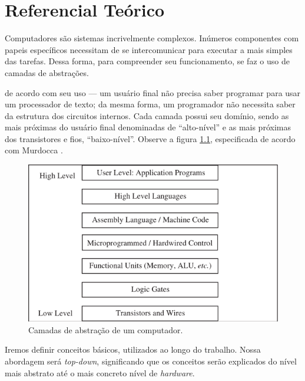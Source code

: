 
\chapter{Referencial Teórico}


Computadores são sistemas incrivelmente complexos. Inúmeros componentes com
papeis específicos necessitam de se intercomunicar para executar a mais simples
das tarefas. Dessa forma, para compreender seu funcionamento, se faz o uso de
camadas de abstrações.

de acordo com seu uso --- um usuário final não precisa saber programar para usar
um processador de texto; da mesma forma, um programador não necessita saber da
estrutura dos circuitos internos. Cada camada possui seu domínio, sendo as mais
próximas do usuário final denominadas de ``alto-nível'' e as mais próximas dos
transistores e fios, ``baixo-nível''. Observe a figura \ref{camadas},
especificada de acordo com Murdocca \cite{principles}.

\begin{figure}[ptb]
  \begin{center}
    \includegraphics[scale=.6]{imagens/1_camadas}
  \end{center}
  \caption{Camadas de abstração de um computador.}
  \label{camadas}
\end{figure}

Iremos definir conceitos básicos, utilizados ao longo do trabalho. Nossa
abordagem será \textit{top-down}, significando que os conceitos serão explicados
do nível mais abstrato até o mais concreto nível de \textit{hardware}.

